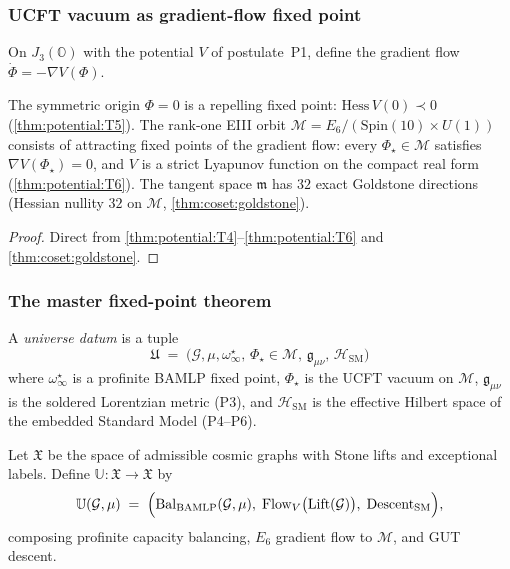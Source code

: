 \subsubsection{UCFT vacuum as gradient-flow fixed point}

On $J_3(\mathbb{O})$ with the potential $V$ of postulate~\textnormal{P1}, define
the gradient flow $\dot\Phi=-\nabla V(\Phi)$.

\begin{theorem}\label{thm:bamlp:vacuum-fp}
The symmetric origin $\Phi=0$ is a repelling fixed point: $\mathrm{Hess}\,V(0)
\prec0$ (\autoref{thm:potential:T5}). The rank-one EIII orbit
$\mathcal{M}=E_6/(\mathrm{Spin}(10)\times U(1))$ consists of attracting fixed
points of the gradient flow: every $\Phi_\star\in\mathcal{M}$ satisfies
$\nabla V(\Phi_\star)=0$, and $V$ is a strict Lyapunov function on the compact
real form (\autoref{thm:potential:T6}). The tangent space $\mathfrak{m}$ has
$32$ exact Goldstone directions (Hessian nullity $32$ on $\mathcal{M}$,
\autoref{thm:coset:goldstone}).
\end{theorem}

\begin{proof}
Direct from \autoref{thm:potential:T4}--\autoref{thm:potential:T6} and
\autoref{thm:coset:goldstone}.
\end{proof}

\subsubsection{The master fixed-point theorem}

\begin{definition}\label{def:bamlp:universe}
A \emph{universe datum} is a tuple
\begin{equation}
  \mathfrak{U}\;=\;\bigl(\mathcal{G},\mu,\omega^\star_\infty,\,
  \Phi_\star\in\mathcal{M},\,\mathfrak{g}_{\mu\nu},\,\mathcal{H}_{\mathrm{SM}}
  \bigr)
\end{equation}
where $\omega^\star_\infty$ is a profinite BAMLP fixed point, $\Phi_\star$ is
the UCFT vacuum on $\mathcal{M}$, $\mathfrak{g}_{\mu\nu}$ is the soldered
Lorentzian metric (P3), and $\mathcal{H}_{\mathrm{SM}}$ is the effective
Hilbert space of the embedded Standard Model (P4--P6).
\end{definition}

\begin{definition}\label{def:bamlp:Uop}
Let $\mathfrak{X}$ be the space of admissible cosmic graphs with Stone lifts
and exceptional labels. Define $\mathbb{U}:\mathfrak{X}\to\mathfrak{X}$ by
\begin{equation}
  \mathbb{U}(\mathcal{G},\mu)
  \;=\;\Bigl(\mathrm{Bal}_\mathrm{BAMLP}(\mathcal{G},\mu),\;
  \mathrm{Flow}_V\bigl(\mathrm{Lift}(\mathcal{G})\bigr),\;
  \mathrm{Descent}_{\mathrm{SM}}\Bigr),
  \label{eq:bamlp:Uop}
\end{equation}
composing profinite capacity balancing, $E_6$ gradient flow to $\mathcal{M}$,
and GUT descent.
\end{definition}

